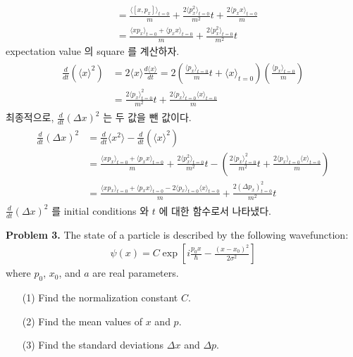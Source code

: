 \documentclass[floatfix,nofootinbib,superscriptaddress,fleqn]{revtex4}
\begin{document}
\begin{itemize}
\begin{align}
    &=\frac{\langle[x,p_x]\rangle_{t=0}}{m}
    +\frac{2\langle p_x^2\rangle_{t=0}}{m^2}t
    +\frac{2\langle p_xx\rangle_{t=0}}{m} \\
    &=\frac{\langle xp_x\rangle_{t=0}+\langle p_xx\rangle_{t=0}}{m}
    +\frac{2\langle p_x^2\rangle_{t=0}}{m^2}t
  \end{align}
expectation value 의 square 를 계산하자.
  \begin{align}
    \begin{split}
      \frac{d}{dt}\left(\langle x \rangle^2\right) 
      &=2\langle x\rangle\frac{d\langle x\rangle}{dt}
      =2\left(\frac{\langle p_x\rangle_{t=0}}{m}t
      +\langle x\rangle_{t=0}\right)\left(\frac{\langle p_x\rangle_{t=0}}{m}\right)  \\
      &=\frac{2\langle p_x\rangle_{t=0}^2}{m^2}t
      +\frac{2\langle p_x\rangle_{t=0}\langle x\rangle_{t=0}}{m}
    \end{split}
  \end{align}
 최종적으로, $\frac{d}{dt}(\Delta x)^2 $ 는 두 값을 뺀 값이다.
  \begin{align}
    \begin{split}
      \frac{d}{dt}(\Delta x)^2 
      &=\frac{d}{dt}\langle x^2 \rangle
      -\frac{d}{dt}\left(\langle x \rangle^2\right) \\
      &=\frac{\langle xp_x\rangle_{t=0}+\langle p_xx\rangle_{t=0}}{m}
      +\frac{2\langle p_x^2\rangle_{t=0}}{m^2}t
      -\left(\frac{2\langle p_x\rangle_{t=0}^2}{m^2}t
      +\frac{2\langle p_x\rangle_{t=0}\langle x\rangle_{t=0}}{m}
      \right) \\
      &=\frac{\langle xp_x\rangle_{t=0}+\langle p_xx\rangle_{t=0}
      -2\langle p_x\rangle_{t=0}\langle x\rangle_{t=0}}{m}
      +\frac{2\left(\Delta p_x\right)^2_{t=0}}{m^2}t
    \end{split}
  \end{align}
  $\frac{d}{dt}(\Delta x)^2 $ 를 initial conditions 와 $t$ 에 대한 함수로서 나타냈다.
\end{itemize} 
\newpage

\noindent \textbf{Problem 3.} 
The state of a particle is described by the following wavefunction:
\begin{align*}
\psi(x) = C\exp\left[
i\frac{p_0 x}{\hbar} - \frac{(x-x_0)^2}{2\sigma^2} 
\right]
\end{align*}
where $p_0$, $x_0$, and $a$ are real parameters. 
\begin{itemize}
\item[(1)] Find the normalization constant $C$.
\item[(2)] Find the mean values of $x$ and $p$.
\item[(3)] Find the standard deviations $\Delta x$ and $\Delta p$.
\end{itemize}
\vspace{1cm}
\end{document}
